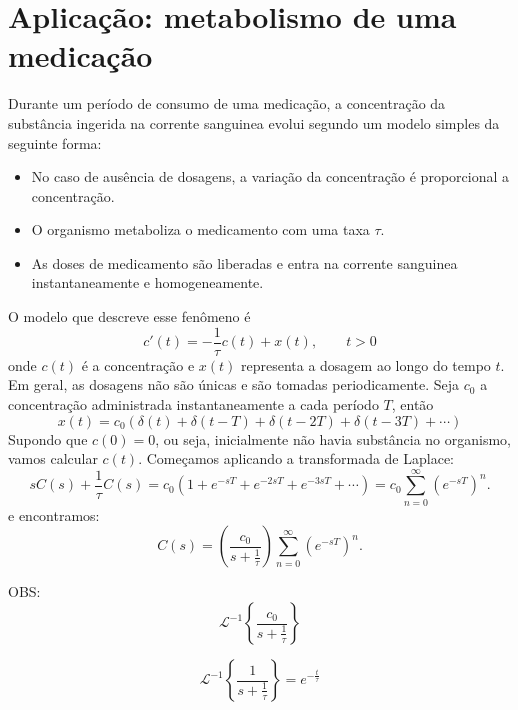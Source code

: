 \documentclass[a4paper,10pt]{book}
\begin{document}
 \section{Aplicação: metabolismo de uma medicação}
Durante um período de consumo de uma medicação, a concentração da substância ingerida na corrente sanguinea evolui segundo um modelo simples da seguinte forma:
\begin{itemize}
 \item No caso de ausência de dosagens, a variação da concentração é proporcional a concentração.
 \item  O organismo metaboliza o medicamento com uma taxa $\tau$.
  \item As doses de medicamento são liberadas e entra na corrente sanguinea instantaneamente e homogeneamente.
\end{itemize}
O modelo que descreve esse fenômeno é
\begin{equation}
c'(t)=-\frac{1}{\tau}c(t)+x(t),\qquad t>0
\end{equation}
onde $c(t)$ é a concentração e $x(t)$ representa a dosagem ao longo do tempo $t$. Em geral, as dosagens não são únicas e são tomadas periodicamente. Seja $c_0$ a concentração administrada instantaneamente a cada período $T$, então
\begin{equation}
x(t)=c_0\left(\delta(t)+\delta(t-T)+\delta(t-2T)+\delta(t-3T)+\cdots\right)
\end{equation}
 Supondo que $c(0)=0$, ou seja, inicialmente não havia substância no organismo, vamos calcular $c(t)$. 
Começamos aplicando a transformada de Laplace:
\begin{equation}
sC(s)+\frac{1}{\tau}C(s)=c_0\left(1+e^{-sT}+e^{-2sT}+e^{-3sT}+\cdots\right)=c_0\sum_{n=0}^\infty\left( e^{-sT}\right)^n.
\end{equation}
e encontramos:
\begin{equation}
C(s)=\left(\frac{c_0}{ s+\frac{1}{\tau}}\right)\sum_{n=0}^\infty\left( e^{-sT}\right)^n.
\end{equation}

OBS: $$\mathcal{L}^{-1}\left\{\frac{c_0}{s+\frac{1}{\tau}}\right\}$$

$$\mathcal{L}^{-1}\left\{\frac{1}{s+\frac{1}{\tau}}\right\}=e^{-\frac{t}{\tau}}$$
\end{document}
